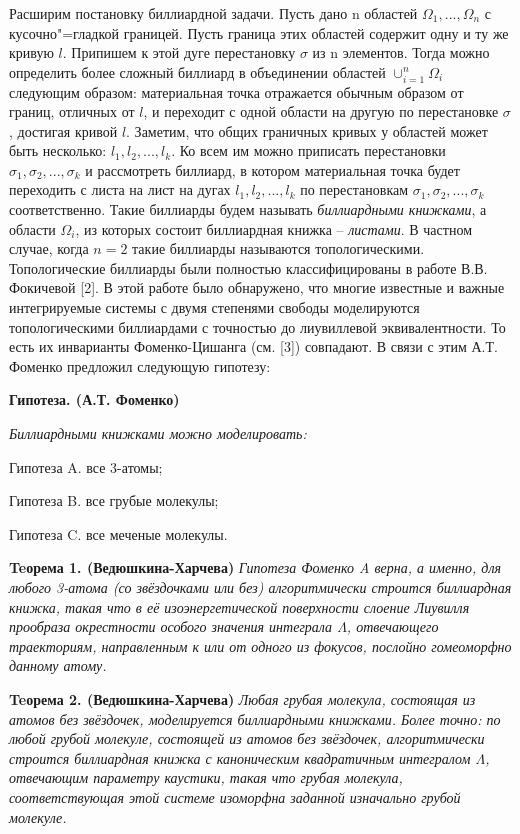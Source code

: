 Расширим постановку биллиардной задачи. Пусть дано n областей $\Omega_1, ... ,\Omega_n$ с кусочно"=гладкой границей. Пусть граница этих областей содержит одну и ту же кривую $ l $. Припишем к этой дуге перестановку $ \sigma $ из n элементов. Тогда можно определить более сложный биллиард в объединении областей $\cup_{i = 1}^n \Omega_i$ следующим образом: материальная точка отражается обычным образом от границ, отличных от $ l $, и переходит с одной области на другую по перестановке $ \sigma $, достигая кривой $ l $. Заметим, что общих граничных кривых у областей может быть несколько: $ l_1, l_2, ..., l_k $. Ко всем им можно приписать перестановки $ \sigma_1, \sigma_2, ..., \sigma_k $  и рассмотреть биллиард, в котором материальная точка будет переходить с листа на лист на дугах $ l_1, l_2, ..., l_k $ по перестановкам $ \sigma_1, \sigma_2, ..., \sigma_k $ соответственно. Такие биллиарды будем называть \textit{биллиардными книжками}, а области $ \Omega_i $,  из которых состоит биллиардная книжка -- \textit{листами}. В частном случае, когда $ n = 2 $ такие биллиарды называются топологическими. Топологические биллиарды были полностью классифицированы в работе В.В.\,Фокичевой [2]. В этой работе было обнаружено, что многие известные и важные интегрируемые системы с двумя степенями свободы моделируются топологическими  биллиардами с точностью до лиувиллевой эквивалентности. То есть их инварианты Фоменко-Цишанга (см. [3]) совпадают. В связи с этим А.Т.\,Фоменко предложил следующую гипотезу:

\textbf{Гипотеза. (А.Т. Фоменко)}
{\it Биллиардными книжками можно моделировать:

	Гипотеза A. все 3-атомы;

	Гипотеза B. все грубые молекулы;

	Гипотеза C. все меченые молекулы.
}

\textbf{Teорема 1. (Ведюшкина-Харчева)}  {\it Гипотеза Фоменко A верна, а именно, для любого 3-атома (со звёздочками или без) алгоритмически строится биллиардная книжка, такая что в её изоэнергетической поверхности слоение Лиувилля прообраза окрестности особого значения интеграла $ \Lambda $, отвечающего траекториям, направленным к или от одного из фокусов, послойно гомеоморфно данному атому.}

\textbf{Teорема 2. (Ведюшкина-Харчева)}  {\it Любая грубая молекула, состоящая из атомов без звёздочек, моделируется биллиардными книжками. Более точно: по любой грубой молекуле, состоящей из атомов без звёздочек, алгоритмически строится биллиардная книжка с каноническим квадратичным интегралом $ \Lambda $, отвечающим параметру каустики, такая что грубая молекула, соответствующая этой системе изоморфна заданной изначально грубой молекуле.}



